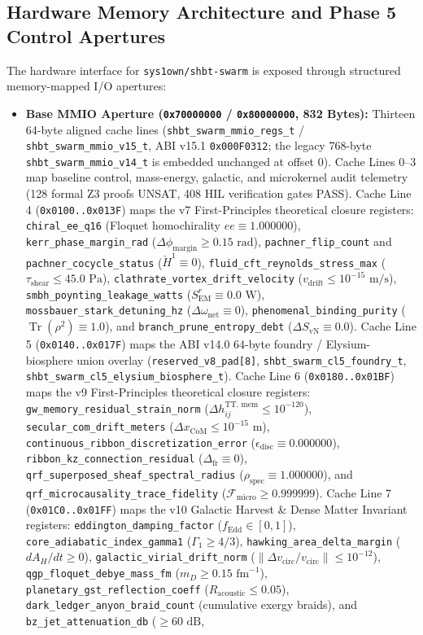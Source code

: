\documentclass[11pt,onecolumn]{article}
\begin{document}
\subsection{Hardware Memory Architecture and Phase 5 Control Apertures}
The hardware interface for \texttt{sys1own/shbt-swarm} is exposed through structured memory-mapped I/O apertures:
\begin{itemize}
    \item \textbf{Base MMIO Aperture (\texttt{0x70000000} / \texttt{0x80000000}, 832 Bytes):} Thirteen 64-byte aligned cache lines (\texttt{shbt\_swarm\_mmio\_regs\_t} / \texttt{shbt\_swarm\_mmio\_v15\_t}, ABI v15.1 \texttt{0x000F0312}; the legacy 768-byte \texttt{shbt\_swarm\_mmio\_v14\_t} is embedded unchanged at offset 0). Cache Lines 0--3 map baseline control, mass-energy, galactic, and microkernel audit telemetry (128 formal Z3 proofs UNSAT, 408 HIL verification gates PASS). Cache Line 4 (\texttt{0x0100..0x013F}) maps the v7 First-Principles theoretical closure registers: \texttt{chiral\_ee\_q16} (Floquet homochirality $ee \equiv 1.000000$), \texttt{kerr\_phase\_margin\_rad} ($\Delta\phi_{\mathrm{margin}} \ge 0.15\text{ rad}$), \texttt{pachner\_flip\_count} and \texttt{pachner\_cocycle\_status} ($\check{H}^1 \equiv 0$), \texttt{fluid\_cft\_reynolds\_stress\_max} ($\tau_{\mathrm{shear}} \le 45.0\text{ Pa}$), \texttt{clathrate\_vortex\_drift\_velocity} ($v_{\mathrm{drift}} \le 10^{-15}\text{ m/s}$), \texttt{smbh\_poynting\_leakage\_watts} ($S_{\mathrm{EM}}^r \equiv 0.0\text{ W}$), \texttt{mossbauer\_stark\_detuning\_hz} ($\Delta\omega_{\mathrm{net}} \equiv 0$), \texttt{phenomenal\_binding\_purity} ($\operatorname{Tr}(\rho^2) \equiv 1.0$), and \texttt{branch\_prune\_entropy\_debt} ($\Delta S_{\mathrm{vN}} \equiv 0.0$). Cache Line 5 (\texttt{0x0140..0x017F}) maps the ABI v14.0 64-byte foundry / Elysium-biosphere union overlay (\texttt{reserved\_v8\_pad[8]}, \texttt{shbt\_swarm\_cl5\_foundry\_t}, \texttt{shbt\_swarm\_cl5\_elysium\_biosphere\_t}). Cache Line 6 (\texttt{0x0180..0x01BF}) maps the v9 First-Principles theoretical closure registers: \texttt{gw\_memory\_residual\_strain\_norm} ($\Delta h_{ij}^{\text{TT, mem}} \le 10^{-120}$), \texttt{secular\_com\_drift\_meters} ($\Delta x_{\text{CoM}} \le 10^{-15}\text{ m}$), \texttt{continuous\_ribbon\_discretization\_error} ($\epsilon_{\text{disc}} \equiv 0.000000$), \texttt{ribbon\_kz\_connection\_residual} ($\Delta_{\text{fr}} \equiv 0$), \texttt{qrf\_superposed\_sheaf\_spectral\_radius} ($\rho_{\text{spec}} \equiv 1.000000$), and \texttt{qrf\_microcausality\_trace\_fidelity} ($\mathcal{F}_{\text{micro}} \ge 0.999999$). Cache Line 7 (\texttt{0x01C0..0x01FF}) maps the v10 Galactic Harvest \& Dense Matter Invariant registers: \texttt{eddington\_damping\_factor} ($f_{\text{Edd}} \in [0, 1]$), \texttt{core\_adiabatic\_index\_gamma1} ($\Gamma_1 \ge 4/3$), \texttt{hawking\_area\_delta\_margin} ($dA_H / dt \ge 0$), \texttt{galactic\_virial\_drift\_norm} ($\|\Delta v_{\text{circ}} / v_{\text{circ}}\| \le 10^{-12}$), \texttt{qgp\_floquet\_debye\_mass\_fm} ($m_D \ge 0.15\text{ fm}^{-1}$), \texttt{planetary\_gst\_reflection\_coeff} ($R_{\text{acoustic}} \le 0.05$), \texttt{dark\_ledger\_anyon\_braid\_count} (cumulative exergy braids), and \texttt{bz\_jet\_attenuation\_db} ($\ge 60\text{ dB}$, 
\end{itemize}
\end{document}
